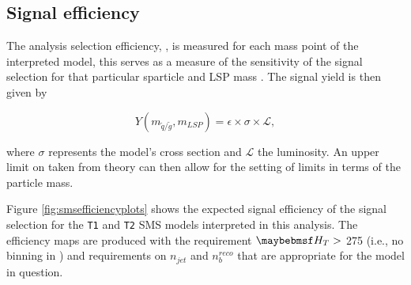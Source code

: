\subsection{Signal efficiency}

The analysis selection efficiency, \epsilon, is measured for each mass point of the interpreted model, this serves as a measure of the sensitivity of the signal selection for that particular sparticle and \ac{LSP} mass . The signal yield is then given by

\begin{equation}
Y(m_{\widetilde{q}/\widetilde{g}},m_{LSP}) = \epsilon \times \sigma \times \mathcal{L},
\end{equation}

where $\sigma$ represents the model's cross section and $\mathcal{L}$ the luminosity. An upper limit on \sigma taken from theory can then allow for the setting of limits in terms of the particle mass. 

Figure \ref{fig:smsefficiencyplots} shows the expected signal efficiency of the signal selection for the \texttt{T1} and \texttt{T2} \ac{SMS} models interpreted in this analysis. The efficiency maps are produced with the requirement $\theht >$ 275 \GeV (i.e., no binning in \theht) and requirements on $n_{jet}$ and $n_{b}^{reco}$ that are appropriate for the model in question.


